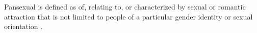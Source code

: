 Pansexual is defined as of, relating to, or characterized by sexual or romantic 
attraction that is not limited to people of a particular gender identity or 
sexual orientation \cite{pansexual-def}.
